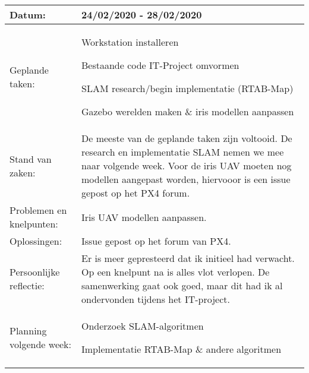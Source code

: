 \begin{tabularx}{\textwidth}{| l | X |}
  \hline
  Datum: & 24/02/2020 - 28/02/2020\\
  \hline
  Geplande taken: &
  \begin{compactitem}
    \item Workstation installeren
    \item Bestaande code IT-Project omvormen
    \item SLAM research/begin implementatie (RTAB-Map)
    \item Gazebo werelden maken \& iris modellen aanpassen
  \end{compactitem}\\
  \hline
  Stand van zaken: & De meeste van de geplande taken zijn voltooid. De research en implementatie SLAM nemen we mee naar volgende week. Voor de iris UAV moeten nog  modellen aangepast worden, hiervooor is een issue gepost op het PX4 forum.\\
  \hline
  Problemen en knelpunten: & Iris UAV modellen aanpassen.\\
  \hline
  Oplossingen: & Issue gepost op het forum van PX4.\\
  \hline
  Persoonlijke reflectie: & Er is meer gepresteerd dat ik initieel had verwacht. Op een knelpunt na is alles vlot verlopen. De samenwerking gaat ook goed, maar dit had ik al ondervonden tijdens het IT-project.\\
  \hline
  Planning volgende week: &
  \begin{compactitem}
    \item Onderzoek SLAM-algoritmen
    \item Implementatie RTAB-Map \& andere algoritmen
  \end{compactitem}\\
  \hline
\end{tabularx}